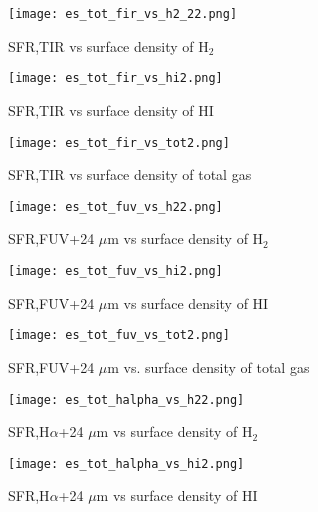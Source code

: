 \documentclass[useAMS,usenatbib]{mn2e}
\begin{document}
\begin{figure*}
    \centering
    \begin{subfigure}[b]{0.3\textwidth}
        \centering
        \texttt{[image: es\_tot\_fir\_vs\_h2\_22.png]}
        \caption{SFR,TIR vs surface density of H$_2$}
        \label{fig:es,all,fir,h2}
    \end{subfigure}
    \hfill
    \begin{subfigure}[b]{0.3\textwidth}
        \centering
        \texttt{[image: es\_tot\_fir\_vs\_hi2.png]}
        \caption{SFR,TIR vs surface density of HI}
        \label{fig:es,all,fir,hi}
    \end{subfigure}
    \hfill
   \begin{subfigure}[b]{0.3\textwidth}
        \centering
        \texttt{[image: es\_tot\_fir\_vs\_tot2.png]}
        \caption{SFR,TIR vs surface density of total gas}
        \label{fig:es,all,fir,tot}
    \end{subfigure}
    \hfill
     \begin{subfigure}[b]{0.3\textwidth}
        \centering
        \texttt{[image: es\_tot\_fuv\_vs\_h22.png]}
        \caption{SFR,FUV+24 $\mu$m vs surface density of H$_2$}
        \label{fig:es,all,fuv,h2}
    \end{subfigure}
     \hfill
   \begin{subfigure}[b]{0.3\textwidth}
        \centering
        \texttt{[image: es\_tot\_fuv\_vs\_hi2.png]}
        \caption{SFR,FUV+24 $\mu$m vs surface density of HI}
        \label{fig:es,all,fuv,hi}
    \end{subfigure}
    \hfill
    \begin{subfigure}[b]{0.3\textwidth}
        \centering
        \texttt{[image: es\_tot\_fuv\_vs\_tot2.png]}
        \caption{SFR,FUV+24 $\mu$m vs. surface density of total gas}
        \label{fig:es,all,fuv,tot}
    \end{subfigure}
    \hfill
     \begin{subfigure}[b]{0.3\textwidth}
        \centering
        \texttt{[image: es\_tot\_halpha\_vs\_h22.png]}
        \caption{SFR,H$\alpha$+24 $\mu$m vs surface density of H$_2$}
        \label{fig:es,all,halpha,h2}
    \end{subfigure}
     \hfill
   \begin{subfigure}[b]{0.3\textwidth}
        \centering
        \texttt{[image: es\_tot\_halpha\_vs\_hi2.png]}
        \caption{SFR,H$\alpha$+24 $\mu$m vs surface density of HI}

\end{subfigure}
\end{figure*}
\end{document}
